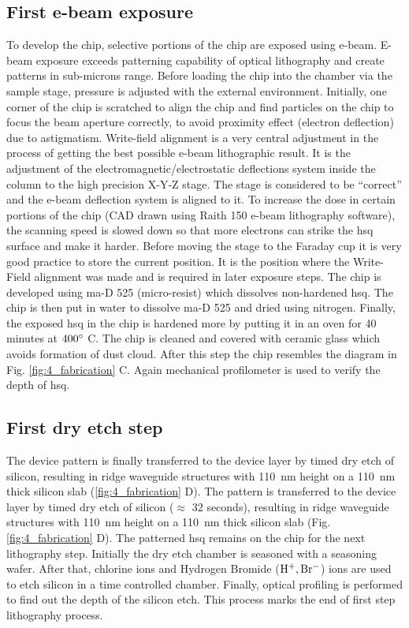 \documentclass[../report.tex]{subfiles}
\begin{document}
\subsection{First e-beam exposure}
To develop the chip, selective portions of the chip are exposed using e-beam. E-beam exposure exceeds patterning capability of optical lithography and create patterns in sub-microns range. Before loading the chip into the chamber via the sample stage, pressure is adjusted with the external environment. Initially, one corner of the chip is scratched to align the chip and find particles on the chip to focus the beam aperture correctly, to avoid proximity effect (electron deflection) due to astigmatism. Write-field alignment is a very central adjustment in the process of getting the best possible e-beam lithographic result. It is the adjustment of the electromagnetic/electrostatic deflections system inside the column to the high precision X-Y-Z stage. The stage is considered to be ``correct'' and the e-beam deflection system is aligned to it. To increase the dose in certain portions of the chip (CAD drawn using Raith 150 e-beam lithography software), the scanning speed is slowed down so that more electrons can strike the \gls{hsq} surface and make it harder. Before moving the stage to the Faraday cup it is very good practice to store the current position. It is the position where the Write-Field alignment was made and is required in later exposure steps. The chip is developed using ma-D 525 (micro-resist) which dissolves non-hardened \gls{hsq}. The chip is then put in water to dissolve ma-D 525 and dried using nitrogen. Finally, the exposed \gls{hsq} in the chip is hardened more by putting it in an oven for 40 minutes at $\mathrm{400^{\circ}}$ C. The chip is cleaned and covered with ceramic glass which avoids formation of dust cloud. After this step the chip resembles the diagram in Fig. \ref{fig:4_fabrication} C. Again mechanical profilometer is used to verify the depth of \gls{hsq}.    

\subsection{First dry etch step}
The device pattern is finally transferred to the device layer by timed dry etch of silicon, resulting in ridge waveguide structures with \SI{110}{\nano \meter} height on a \SI{110}{\nano \meter} thick silicon slab (\ref{fig:4_fabrication} D). The pattern is transferred to the device layer by timed dry etch of silicon ($\approx$ 32 seconds), resulting in ridge waveguide structures with \SI{110}{\nano \meter} height on a \SI{110}{\nano \meter} thick silicon slab (Fig. \ref{fig:4_fabrication} D). The patterned \gls{hsq} remains on the chip for the next lithography step. Initially the dry etch chamber is seasoned with a seasoning wafer. After that, chlorine ions and Hydrogen Bromide ($\mathrm{H^{+}, Br^{-}}$) ions are used to etch silicon in a time controlled chamber. Finally, optical profiling is performed to find out the depth of the silicon etch. This process marks the end of first step lithography process.
\end{document}

